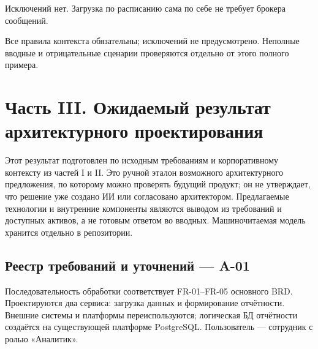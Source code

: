 \documentclass[10pt,a4paper]{article}
\begin{document}
Исключений нет. Загрузка по расписанию сама по себе не требует брокера сообщений.

Все правила контекста обязательны; исключений не предусмотрено. Неполные вводные и отрицательные сценарии проверяются отдельно от этого полного примера.

\clearpage

\section{Часть III. Ожидаемый результат архитектурного проектирования}\label{ux447ux430ux441ux442ux44c-iii-ux43eux436ux438ux434ux430ux435ux43cux44bux439-ux440ux435ux437ux443ux43bux44cux442ux430ux442-ux430ux440ux445ux438ux442ux435ux43aux442ux443ux440ux43dux43eux433ux43e-ux43fux440ux43eux435ux43aux442ux438ux440ux43eux432ux430ux43dux438ux44f}

Этот результат подготовлен по {исходным требованиям и корпоративному контексту} из частей I и II. Это ручной эталон возможного архитектурного предложения, по которому можно проверять будущий продукт; он не утверждает, что решение уже создано ИИ или согласовано архитектором. Предлагаемые технологии и внутренние компоненты являются выводом из требований и доступных активов, а не готовым ответом во вводных. {Машиночитаемая модель} хранится отдельно в репозитории.

\subsection{Реестр требований и уточнений --- A-01}\label{ux440ux435ux435ux441ux442ux440-ux442ux440ux435ux431ux43eux432ux430ux43dux438ux439-ux438-ux443ux442ux43eux447ux43dux435ux43dux438ux439--a-01}

Последовательность обработки соответствует FR-01--FR-05 основного BRD. Проектируются два сервиса: загрузка данных и формирование отчётности. Внешние системы и платформы переиспользуются; логическая БД отчётности создаётся на существующей платформе PostgreSQL. Пользователь --- сотрудник с ролью «Аналитик».
\end{document}
